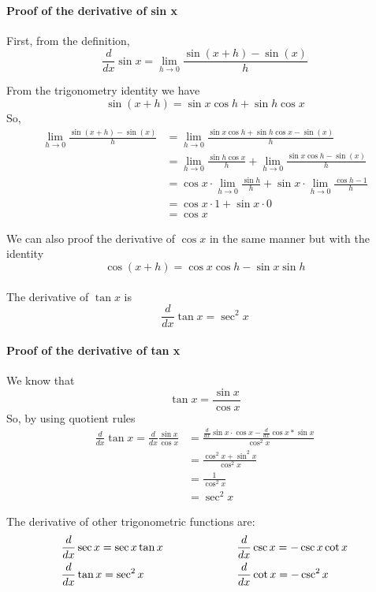 \documentclass[12pt]{article}
\newcommand\tab[1][1cm]{\hspace*{#1}}
\begin{document}
\paragraph{Proof of the derivative of sin x} First, from the definition,
\[
    \frac{d}{dx} \sin x = \lim_{h \to 0} \frac{\sin (x + h) - \sin (x)}{h} 
\]

\noindent
From the trigonometry identity we have
\[
    \sin (x + h) = \sin x \cos h + \sin h \cos x
\]
\noindent
So,
\begin{align*} 
    \lim_{h \to 0} \frac{\sin (x + h) - \sin (x)}{h} &= \lim_{h \to 0} \frac{ \sin x \cos h + \sin h \cos x - \sin (x)}{h} \\
    &= \lim_{h \to 0} \frac{\sin h \cos x}{h} +  \lim_{h \to 0} \frac{ \sin x \cos h - \sin (x)}{h} \\
    &= \cos x \cdot \lim_{h \to 0} \frac{\sin h}{h} + \sin x  \cdot \lim_{h \to 0} \frac{ \cos h - 1}{h} \\ 
    &= \cos x \cdot 1 + \sin x \cdot 0 \\
    &= \cos x
\end{align*}

\noindent
We can also proof the derivative of $\cos x$ in the same manner but with the identity
\[
    \cos (x + h) = \cos x \cos h - \sin x \sin h
\]
\\
\noindent
The derivative of $\tan x$ is 
\[
    \frac{d}{dx} \tan x = \sec^2 x
\]
\paragraph{Proof of the derivative of tan x} We know that
\[
    \tan x = \frac{\sin x}{\cos x} 
\]
So, by using quotient rules
\begin{align*} 
    \frac{d}{dx} \tan x = \frac{d}{dx} \frac{\sin x}{\cos x} &= \frac{ \frac{d}{dx} \sin x \cdot \cos x - \frac{d}{dx}\cos x * \sin x}{\cos^2 x} \\
    &= \frac{\cos^2 x + \sin^2 x}{\cos^2 x} \\
    &= \frac{1}{\cos^2 x}\\
    &= \sec^2 x
\end{align*}

The derivative of other trigonometric functions are:
\begin{align*} 
    &\frac{d}{dx} \sec x = \sec x \tan x \textrm{\tab \tab} &&\frac{d}{dx} \csc x = - \csc x \cot x \\
    &\frac{d}{dx} \tan x = \sec^2 x &&\frac{d}{dx} \cot x = - \csc^2 x
\end{align*}
\end{document}
